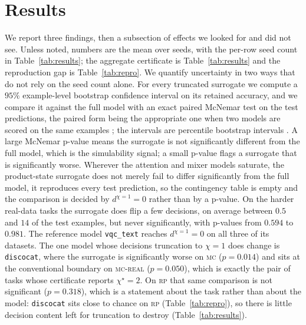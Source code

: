 \documentclass[10pt]{article}
\begin{document}
\section{Results}
\label{sec:results}
We report three findings, then a subsection of effects we looked for and did not see. Unless noted,
numbers are the mean over seeds, with the per-row seed count in Table~\ref{tab:results}; the
aggregate certificate is Table~\ref{tab:results} and the reproduction gap is Table~\ref{tab:repro}.
We quantify uncertainty in two ways that do not rely on the seed count alone. For every truncated
surrogate we compute a $95\%$ example-level bootstrap confidence interval on its retained accuracy,
and we compare it against the full model with an exact paired McNemar test \citep{mcnemar1947} on
the test predictions, the paired form being the appropriate one when two models are scored on the
same examples \citep{dietterich1998}; the intervals are percentile bootstrap intervals
\citep{efron1979}.
A large McNemar p-value means the surrogate is not significantly different from the full model, which
is the simulability signal; a small p-value flags a surrogate that is significantly worse. Wherever
the attention and mixer models saturate, the product-state surrogate does not merely fail to differ
significantly from the full model, it reproduces every test prediction, so the contingency table is
empty and the comparison is decided by $d^{\chi=1}{=}0$ rather than by a p-value. On the harder
real-data tasks the surrogate does flip a few decisions, on average between $0.5$ and $14$ of the
test examples, but never significantly, with p-values from $0.594$ to $0.981$. The reference model
\texttt{vqc\_text} reaches $d^{\chi=1}{=}0$ on all three of its datasets. The one model whose
decisions truncation to $\chi{=}1$ does change is \texttt{discocat}, where the surrogate is
significantly worse on \textsc{mc} ($p{=}0.014$) and sits at the conventional boundary on
\textsc{mc-real} ($p{=}0.050$), which is exactly the pair of tasks whose certificate reports
$\chi^\star{=}2$. On \textsc{rp} that same comparison is not significant ($p{=}0.318$), which is a
statement about the task rather than about the model: \texttt{discocat} sits close to chance on
\textsc{rp} (Table~\ref{tab:repro}), so there is little decision content left for truncation to
destroy (Table~\ref{tab:results}).
\end{document}
